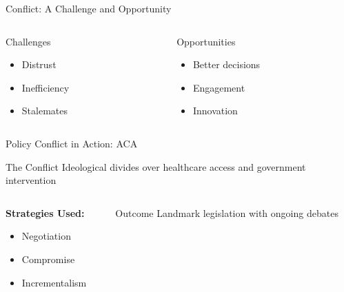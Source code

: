 \documentclass[10pt]{beamer}
\begin{document}
\begin{frame}{Conflict: A Challenge and Opportunity}
    \begin{columns}[T]
        \begin{column}{0.5\textwidth}
            \begin{alertblock}{Challenges}
                \begin{itemize}
                    \item Distrust
                    \item Inefficiency
                    \item Stalemates
                \end{itemize}
            \end{alertblock}
        \end{column}
        \begin{column}{0.5\textwidth}
            \begin{block}{Opportunities}
                \begin{itemize}
                    \item Better decisions
                    \item Engagement
                    \item Innovation
                \end{itemize}
            \end{block}
        \end{column}
    \end{columns}
\end{frame}

\begin{frame}{Policy Conflict in Action: ACA}
    \begin{block}{The Conflict}
        Ideological divides over healthcare access and government intervention
    \end{block}
    
    \begin{columns}[T]
        \begin{column}{0.5\textwidth}
            \textbf{Strategies Used:}
            \begin{itemize}
                \item Negotiation
                \item Compromise
                \item Incrementalism
            \end{itemize}
        \end{column}
        \begin{column}{0.5\textwidth}
            \begin{alertblock}{Outcome}
                Landmark legislation with ongoing debates
            \end{alertblock}
        \end{column}
    \end{columns}
\end{frame}
\end{document}

